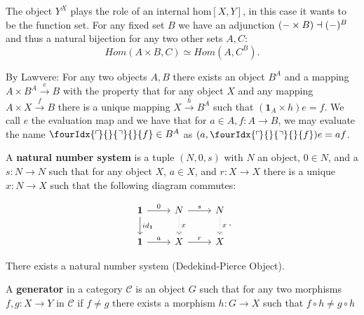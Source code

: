 \begin{remark}[$\dagger$]
The object $Y^X$ plays the role of an internal hom$[X,Y]$, in this case it wants to be the function set. For any fixed set $B$ we have an adjunction $(\-- \times B) \dashv (\--)^B$ and thus a natural bijection for any two other sets $A,C$:
\begin{equation*}
Hom(A \times B, C) \simeq Hom(A, C^B).
\end{equation*}

By Lawvere: For any two objects $A, B$ there exists an object $B^A$ and a mapping $A \times B^A \xrightarrow{e} B$ with the property that for any object $X$ and any mapping $A \times X\xrightarrow{f} B$ there is a unique mapping $X \xrightarrow{h} B^A$ such that $(\mathbf{1}_A \times h)e = f$. We call $e$ the evaluation map and we have that for $a \in A, f:A\longrightarrow B$, we may evaluate the name $\fourIdx{\ulcorner\mkern-3mu}{}{\urcorner}{}{f} \in B^A$ as $(a,\fourIdx{\ulcorner\mkern-3mu}{}{\urcorner}{}{f})e = af$.

\end{remark}




\begin{definition}
A \textbf{natural number system} is a tuple $(N,0,s)$ with $N$ an object, $0 \in N$, and a $s: N \longrightarrow N$ such that for any object $X$, $a \in X$, and $r: X \longrightarrow X$
there is a unique $x: N \longrightarrow X$ such that the following diagram commutes:

\begin{equation*}
\begin{tikzcd}
\mathbf{1} \arrow[r, "0"] \arrow[d, "id_\mathbf{1}"]
& N \arrow[r, "s"] \arrow[d, "x", dotted]
& N \arrow[d, "x", dotted]   \\
\mathbf{1} \arrow[r, "a"]
& X \arrow[r, "r"]
& X
\end{tikzcd}.
\end{equation*}

\end{definition}

\begin{axiom}
There exists a natural number system (Dedekind-Pierce Object).
\end{axiom}

\begin{definition}
A \textbf{generator} in a category $\mathcal{C}$ is an object $G$ such that for any two morphisms $f,g: X \longrightarrow Y$ in $\mathcal{C}$ if $f \neq g$ there exists a morphism $h: G \longrightarrow X$ such that $f \circ h \neq g \circ h$
\end{definition}

